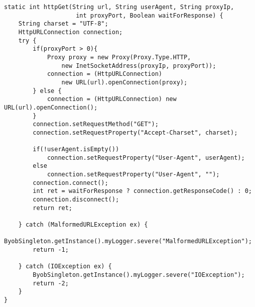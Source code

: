 \vspace{0.5cm}
\begin{lstlisting}
static int httpGet(String url, String userAgent, String proxyIp, 
					int proxyPort, Boolean waitForResponse) {  
    String charset = "UTF-8"; 
    HttpURLConnection connection;
    try {
	    if(proxyPort > 0){
		    Proxy proxy = new Proxy(Proxy.Type.HTTP, 
			    new InetSocketAddress(proxyIp, proxyPort));
		    connection = (HttpURLConnection) 
			    new URL(url).openConnection(proxy);
	    } else {
		    connection = (HttpURLConnection) new URL(url).openConnection();
	    }
	    connection.setRequestMethod("GET");
	    connection.setRequestProperty("Accept-Charset", charset);
	    
	    if(!userAgent.isEmpty())
		    connection.setRequestProperty("User-Agent", userAgent);
	    else
		    connection.setRequestProperty("User-Agent", "");
	    connection.connect();
	    int ret = waitForResponse ? connection.getResponseCode() : 0;
	    connection.disconnect();
	    return ret;
	    
    } catch (MalformedURLException ex) {
	    ByobSingleton.getInstance().myLogger.severe("MalformedURLException");
	    return -1;
    
    } catch (IOException ex) {
	    ByobSingleton.getInstance().myLogger.severe("IOException");
	    return -2; 
    }   
}
\end{lstlisting} 




